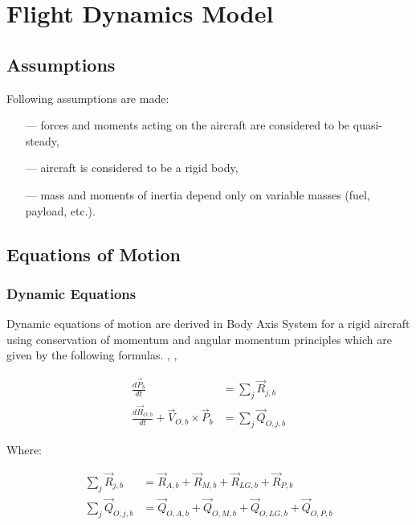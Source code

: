 \chapter{Flight Dynamics Model}

\section{Assumptions}

Following assumptions are made:
\begin{itemize}
  \item[---] forces and moments acting on the aircraft are considered to be quasi-steady,
  \item[---] aircraft is considered to be a rigid body,
  \item[---] mass and moments of inertia depend only on variable masses (fuel, payload, etc.).
\end{itemize}

\section{Equations of Motion}

\subsection{Dynamic Equations}

Dynamic equations of motion are derived in Body Axis System for a rigid aircraft using conservation of momentum and angular momentum principles which are given by the following formulas. \cite{Taylor2005}, \cite{Osinski1997}, \cite{Leyko2002}

\begin{align}
  \label{eq-fdm-mom-deriv-1}
  \frac{d {\vec P}_b}{dt}
  &=
  \sum_{j} {\vec R}_{j,b} \\
  \label{eq-fdm-ang-mom-deriv-1}
  \frac{d {\vec H}_{O,b}}{dt} + {\vec V}_{O,b} \times {\vec P}_b
  &=
  \sum_{j} {\vec Q}_{O,j,b}
\end{align}

Where:

\begin{align}
  \sum_{j} {\vec R}_{j,b}
  &=
  {\vec R}_{A,b} + {\vec R}_{M,b} + {\vec R}_{LG,b} + {\vec R}_{P,b} \\
  \sum_{j} {\vec Q}_{O,j,b}
  &=
  {\vec Q}_{O,A,b} + {\vec Q}_{O,M,b} + {\vec Q}_{O,LG,b} + {\vec Q}_{O,P,b}
\end{align}

